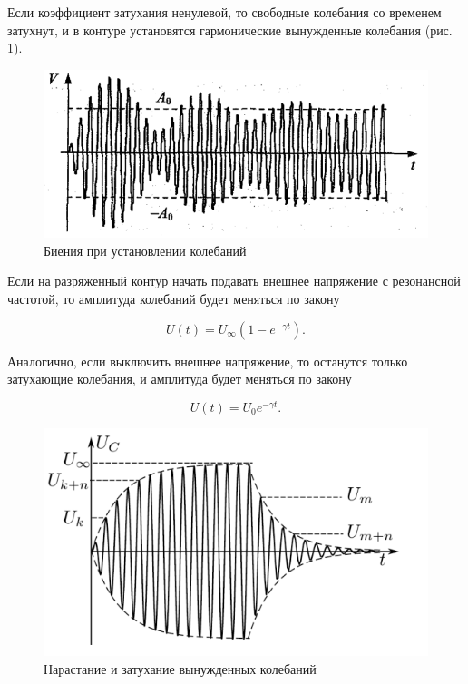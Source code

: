 \documentclass[a4paper, 12pt]{article}
\begin{document}
    Если коэффициент затухания ненулевой, то свободные колебания со временем затухнут, и в контуре установятся гармонические вынужденные колебания (рис. \ref{ho}).

    \begin{figure}[H]
        \centering
        \includegraphics[scale = 0.5]{images/harmosc.png}
        \caption{Биения при установлении колебаний}
        \label{ho}
    \end{figure}

    Если на разряженный контур начать подавать внешнее напряжение с резонансной частотой, то амплитуда колебаний будет меняться по закону

    \begin{equation}
        U(t) = U_\infty \left( 1-e^{-\gamma t} \right).
    \end{equation}

    Аналогично, если выключить внешнее напряжение, то останутся только затухающие колебания, и амплитуда будет меняться по закону

    \begin{equation}
        U(t) = U_0 e^{-\gamma t}.
    \end{equation}

    \begin{figure}[H]
        \centering
        \includegraphics[scale = 0.7]{images/fosc.png}
        \caption{Нарастание и затухание вынужденных колебаний}
        \label{fosc}
    \end{figure}
\end{document}
